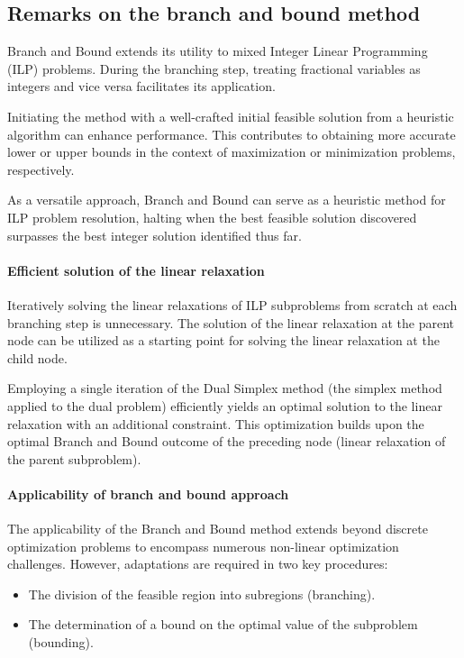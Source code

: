 \subsection{Remarks on the branch and bound method}
Branch and Bound extends its utility to mixed Integer Linear Programming (ILP) problems. During the branching step, treating fractional variables as integers and vice versa facilitates its application.

Initiating the method with a well-crafted initial feasible solution from a heuristic algorithm can enhance performance. 
This contributes to obtaining more accurate lower or upper bounds in the context of maximization or minimization problems, respectively.

As a versatile approach, Branch and Bound can serve as a heuristic method for ILP problem resolution, halting when the best feasible solution discovered surpasses the best integer solution identified thus far.

\paragraph*{Efficient solution of the linear relaxation}
Iteratively solving the linear relaxations of ILP subproblems from scratch at each branching step is unnecessary. 
The solution of the linear relaxation at the parent node can be utilized as a starting point for solving the linear relaxation at the child node.

Employing a single iteration of the Dual Simplex method (the simplex method applied to the dual problem) efficiently yields an optimal solution to the linear relaxation with an additional constraint. 
This optimization builds upon the optimal Branch and Bound outcome of the preceding node (linear relaxation of the parent subproblem).

\paragraph*{Applicability of branch and bound approach}
The applicability of the Branch and Bound method extends beyond discrete optimization problems to encompass numerous non-linear optimization challenges. 
However, adaptations are required in two key procedures:
\begin{itemize}
    \item The division of the feasible region into subregions (branching).
    \item The determination of a bound on the optimal value of the subproblem (bounding).
\end{itemize}
